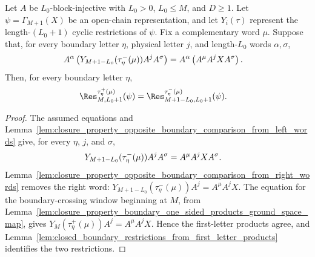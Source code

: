 \begin{lemma}
    \label{thm:closure_property_boundary_restrictions_ground_space_map_left_words}
    \leanok
    Let $A$ be $L_0$-block-injective with $L_0>0$, $L_0\le M$, and
    $D\ge1$. Let $\psi=\Gamma_{M+1}(X)$ be an open-chain representation,
    and let $Y_i(\tau)$ represent the length-$(L_0+1)$ cyclic restrictions of
    $\psi$. Fix a complementary word $\mu$. Suppose that, for every boundary
    letter $\eta$, physical letter $j$, and length-$L_0$ words
    $\alpha,\sigma$,
    \begin{align}
        A^\alpha
        \left(Y_{M+1-L_0}(\tau^-_\eta(\mu))A^jA^\sigma\right)
         & =
        A^\alpha\left(A^\mu A^jXA^\sigma\right).
        \notag
    \end{align}
    Then, for every boundary letter $\eta$,
    \begin{align}
        \Res^{\tau^+_\eta(\mu)}_{M,L_0+1}(\psi)
         & =
        \Res^{\tau^-_\eta(\mu)}_{M+1-L_0,L_0+1}(\psi).
        \notag
    \end{align}
\end{lemma}

\begin{proof}
    \leanok
    The assumed equations and
    Lemma~\ref{lem:closure_property_opposite_boundary_comparison_from_left_words}
    give, for every $\eta$, $j$, and $\sigma$,
    \begin{align}
        Y_{M+1-L_0}(\tau^-_\eta(\mu))A^jA^\sigma
         & =
        A^\mu A^jXA^\sigma.
        \notag
    \end{align}
    Lemma~\ref{lem:closure_property_opposite_boundary_comparison_from_right_words}
    removes the right word:
    $Y_{M+1-L_0}(\tau^-_\eta(\mu))A^j = A^\mu A^jX$.
    The equation for the boundary-crossing window beginning at $M$, from
    Lemma~\ref{lem:closure_property_boundary_one_sided_products_ground_space_map},
    gives
    $Y_M(\tau^+_\eta(\mu))A^j = A^\mu A^jX$.
    Hence the first-letter products agree, and
    Lemma~\ref{lem:closed_boundary_restrictions_from_first_letter_products}
    identifies the two restrictions.
\end{proof}

